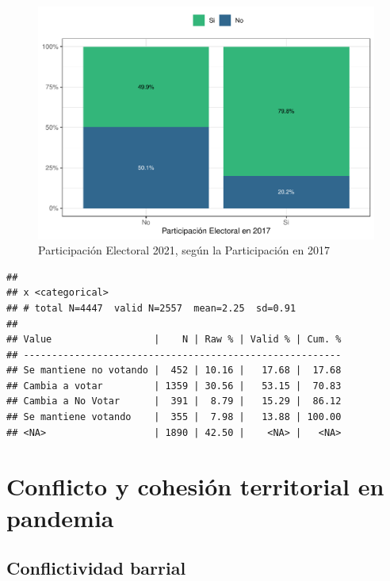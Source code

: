 \documentclass[
  12pt,
  openany]{book}
\begin{document}
\begin{figure}

{\centering \includegraphics{reporte-elsoc_files/figure-latex/2020-vs-2021-1} 

}

\caption{Participación Electoral 2021, según la Participación en 2017}\label{fig:2020-vs-2021}
\end{figure}

\begin{verbatim}
## 
## x <categorical>
## # total N=4447  valid N=2557  mean=2.25  sd=0.91
## 
## Value                  |    N | Raw % | Valid % | Cum. %
## --------------------------------------------------------
## Se mantiene no votando |  452 | 10.16 |   17.68 |  17.68
## Cambia a votar         | 1359 | 30.56 |   53.15 |  70.83
## Cambia a No Votar      |  391 |  8.79 |   15.29 |  86.12
## Se mantiene votando    |  355 |  7.98 |   13.88 | 100.00
## <NA>                   | 1890 | 42.50 |    <NA> |   <NA>
\end{verbatim}

\hypertarget{conflicto-y-cohesiuxf3n-territorial-en-pandemia}{%
\chapter{Conflicto y cohesión territorial en pandemia}\label{conflicto-y-cohesiuxf3n-territorial-en-pandemia}}

\hypertarget{conflictividad-barrial}{%
\section{Conflictividad barrial}\label{conflictividad-barrial}}
\end{document}
